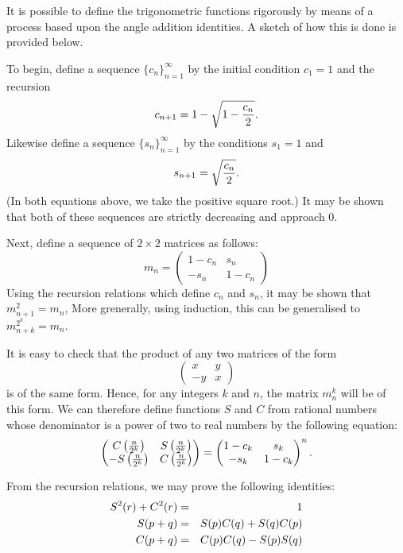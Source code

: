 \documentclass[12pt]{article}
\begin{document}
It is possible to define the trigonometric functions rigorously by means of a
process based upon the angle addition identities.  A sketch of how this is done
is provided below.

To begin, define a sequence $\{c_n\}_{n=1}^\infty$ by the initial condition 
$c_1 = 1$ and the recursion
 \[c_{n+1} = 1 - \sqrt{1 - {c_n \over 2}}.\]
Likewise define a sequence $\{s_n\}_{n=1}^\infty$ by the conditions $s_1 = 1$ and
 \[s_{n+1} = \sqrt{c_n \over 2}.\]
(In both equations above, we take the positive square root.) 
It may be shown that both of these sequences are strictly decreasing and approach $0$.

Next, define a sequence of $2 \times 2$ matrices as follows:
 \[m_n = \left( \begin{matrix} 1 - c_n & s_n \\ - s_n & 1 - c_n \end{matrix} \right) \]
Using the recursion relations which define $c_n$ and $s_n$, it may be shown that
$m_{n+1}^2 = m_n$,  More grenerally, using induction, this can be generalised to
$m_{n+k}^{2^k} = m_n$.

It is easy to check that the product of any two matrices of the form
 \[\left( \begin{matrix} x & y \\ -y & x \end{matrix} \right) \]
is of the same form.  Hence, for any integers $k$ and $n$, the matrix 
$m_n^k$ will be of this form.  We can therefore define functions $S$ and
$C$ from rational numbers whose denominator is a power of two to real
numbers by the following equation:
 \[\left( \begin{matrix} C \left( {n \over 2^k} \right) & S \left( {n 
\over 2^k} \right) \\ - S \left( {n \over 2^k} \right) & C \left( {n 
\over 2^k} \right) \end{matrix} \right) = \left( \begin{matrix} 1 - c_k 
& s_k \\ - s_k & 1 - c_k \end{matrix} \right)^n.\] 

From the recursion relations, we may prove the following identities:
\begin{eqnarray*} S^2 (r) + C^2 (r) &=& 1 \cr
S (p + q) &=& S(p) C(q) + S(q) C(p) \cr
C (p + q) &=& C(p) C(q) - S(p) S(q) \end{eqnarray*}
\end{document}
